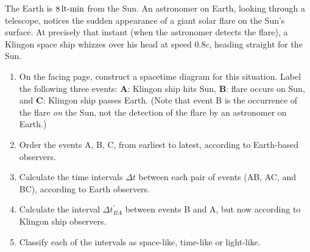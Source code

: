 \begin{problem}
The Earth is $8\,\mbox{lt-min}$ from the Sun.  An astronomer on Earth,
looking through a telescope, notices the sudden appearance of a giant
solar flare on the Sun's surface.  At precisely that instant (when the
astronomer detects the flare), a Klingon space ship whizzes over his
head at speed $0.8c$, heading straight for the Sun.
\begin{enumerate}
\item On the facing page, construct a spacetime diagram for this situation.  
  Label the following three events: {\bf A}: Klingon ship hits Sun, 
  {\bf B}:  flare occurs on Sun, and {\bf C}: Klingon ship passes Earth.  
  (Note that event B is the occurrence of the flare {\em on\/} the Sun, 
  not the detection of the flare by an astronomer on Earth.)
\item Order the events A, B, C, from earliest to latest, according to
  Earth-based observers.
\item Calculate the time intervals $\Delta t$ between each pair of
  events (AB, AC, and BC), according to Earth observers.
\item Calculate the interval $\Delta t^\prime_{BA}$ between events B
  and A, but now according to Klingon ship observers.
\item Classify each of the intervals as space-like, time-like or
  light-like.
\end{enumerate}
\label{prob:solar_flare}
\end{problem}



